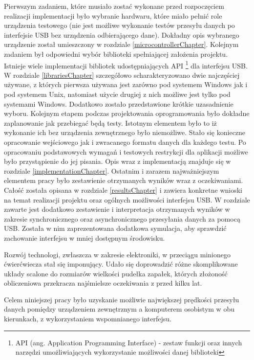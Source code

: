 \documentclass{BscUS}
\begin{document}
\indent Pierwszym zadaniem, które musiało zostać wykonane przed rozpoczęciem realizacji implementacji było wybranie hardwaru, które miało pełnić role urządzenia testowego (nie jest możliwe wykonanie testów przesyłu danych po interfejsie USB bez urządzenia odbierającego dane). Dokładny opis wybranego urządzenie został umieszczony w rozdziale \ref{microcontrollerChapter}. Kolejnym zadaniem był odpowiedni wybór biblioteki spełniającej założenia projektu. Istnieje wiele implementacji bibliotek udostępniających API \footnote{API (ang. Application Programming Interface) - zestaw funkcji oraz innych narzędzi umożliwiających wykorzystanie możliwości danej biblioteki} dla interfejsu USB. W rozdziale \ref{librariesChapter} szczegółowo scharakteryzowano dwie najczęściej używane, z których pierwsza używana jest zarówno pod systemem Windows jak i pod systemem Unix, natomiast użycie drugiej z nich możliwe jest tylko pod systemami Windows. Dodatkowo zostało przedstawione krótkie uzasadnienie wyboru.
\newline
\indent Kolejnym etapem podczas projektowania oprogramowania było dokładne zaplanowanie jak przebiegać będą testy. Istotnym elementem było to iż wykonanie ich bez urządzenia zewnętrznego było niemożliwe. Stało się konieczne opracowanie wejściowego jak i zwracanego formatu danych dla każdego testu. Po opracowaniu podstawowych wymagań i testowych restrykcji dla aplikacji możliwe było przystąpienie do jej pisania. Opis wraz z implementacją znajduje się w rozdziale \ref{implementationChapter}.
\newline
\indent Ostatnim i zarazem najważniejszym elementem pracy było zestawienie otrzymanych wyników wraz z oczekiwaniami. Całość została opisana w rozdziale \ref{resultsChapter} i zawiera konkretne wnioski na temat realizacji projektu oraz ogólnych możliwości interfejsu USB. W rozdziale zawarte jest dodatkowo zestawienie i interpretacja otrzymanych wyników w zakresie synchronicznego oraz asynchronicznego przesyłania danych za pomocą USB. Została w nim zaprezentowana dodatkowa symulacja, aby sprawdzić zachowanie interfejsu w mniej dostępnym środowisku.


\iffalse
Rozwój technologi, zwłaszcza w zakresie elektroniki, w przeciągu minionego ćwierćwiecza stał się imponujący. Udało się doprowadzić różne skomplikowane układy scalone do rozmiarów wielkości pudełka zapałek, których złożoność obliczeniowa przekracza najśmielsze oczekiwania z przed kilku lat. 

Celem niniejszej pracy było uzyskanie możliwie największej prędkości przesyłu danych pomiędzy urządzeniem zewnętrznym a komputerem osobistym w obu kierunkach, z wykorzystaniem wspomnianego interfejsu. 
\end{document}
